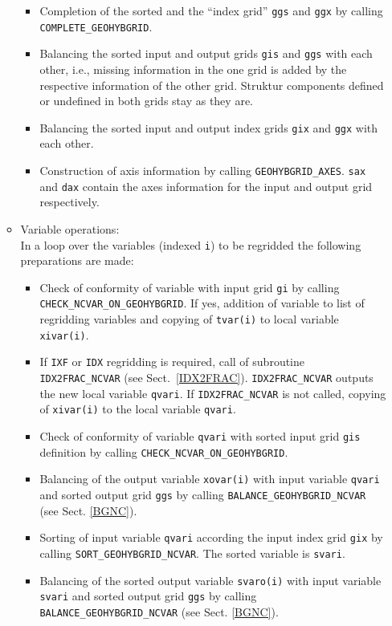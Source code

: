 \documentclass[11pt,twoside]{article}
\begin{document}
\begin{itemize}
\begin{itemize}
\begin{itemize}
\item Completion of the sorted and the ``index grid'' \verb|ggs|
and \verb|ggx| by calling \verb|COMPLETE_GEOHYBGRID|. 
\item Balancing the sorted input and output grids \verb|gis| and \verb|ggs|
 with each other, i.e., missing information in the one grid is
added by the respective information of the other grid. Struktur
components defined or undefined in both grids stay as they are.
\item Balancing the sorted input and output index grids \verb|gix|
and \verb|ggx| with each other.
\item Construction of axis information by
calling  \verb|GEOHYBGRID_AXES|. \verb|sax| and \verb|dax| contain
the axes information for the input and output grid respectively.
\end{itemize}%
\item Variable operations:\\
In a loop over the variables (indexed \verb|i|) to be regridded the following
 preparations are made:
 \begin{itemize}%
\item Check of conformity of variable with input grid \verb|gi| by
 calling \verb|CHECK_NCVAR_ON_GEOHYBGRID|. If yes, addition of
 variable to
 list of regridding variables and copying of  \verb|tvar(i)| to local
 variable \verb|xivar(i)|.
\item If \verb|IXF| or \verb|IDX| regridding is required, call of subroutine
\verb|IDX2FRAC_NCVAR| (see Sect.~\ref{IDX2FRAC}). \verb|IDX2FRAC_NCVAR|
outputs the new local variable \verb|qvari|. If \verb|IDX2FRAC_NCVAR|
is not called, copying of \verb|xivar(i)| to the local variable \verb|qvari|.
\item Check of conformity of variable \verb|qvari| with sorted input grid 
\verb|gis| definition by calling \verb|CHECK_NCVAR_ON_GEOHYBGRID|. 
\item Balancing of the output variable \verb|xovar(i)| with input
variable \verb|qvari| and sorted output grid \verb|ggs| 
by calling \verb|BALANCE_GEOHYBGRID_NCVAR| (see Sect. \ref{BGNC}).
\item Sorting of  input variable \verb|qvari| according the input index grid 
\verb|gix| by calling \verb|SORT_GEOHYBGRID_NCVAR|. The sorted
variable is \verb|svari|.
\item Balancing of the sorted output variable \verb|svaro(i)| with input
variable \verb|svari| and sorted output grid \verb|ggs| 
by calling \verb|BALANCE_GEOHYBGRID_NCVAR| (see Sect. \ref{BGNC}).

\end{itemize}
\end{itemize}
\end{itemize}
\end{document}
